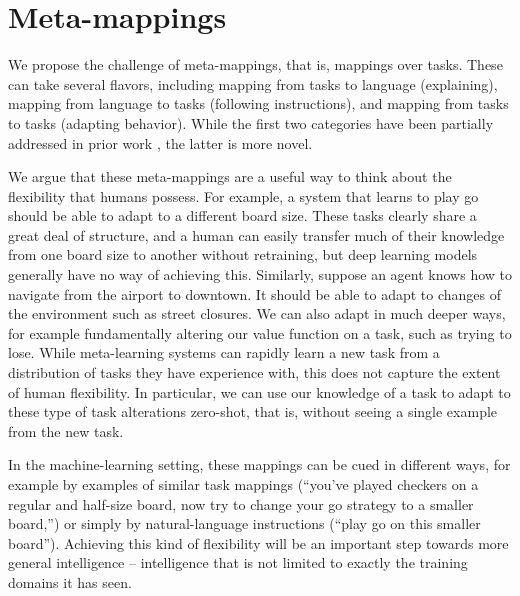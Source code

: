 \documentclass{article}
\begin{document}
\section{Meta-mappings}
We propose the challenge of meta-mappings, that is, mappings over tasks. These can take several flavors, including mapping from tasks to language (explaining), mapping from language to tasks (following instructions), and mapping from tasks to tasks (adapting behavior). While the first two categories have been partially addressed in prior work \citep[e.g.][]{Hermann2017, Co-Reyes2019}, the latter is more novel. \par
We argue that these meta-mappings are a useful way to think about the flexibility that humans possess. For example, a system that learns to play go should be able to adapt to a different board size. These tasks clearly share a great deal of structure, and a human can easily transfer much of their knowledge from one board size to another without retraining, but deep learning models generally have no way of achieving this. Similarly, suppose an agent knows how to navigate from the airport to downtown. It should be able to adapt to changes of the environment such as street closures. We can also adapt in much deeper ways, for example fundamentally altering our value function on a task, such as trying to lose. While meta-learning systems can rapidly learn a new task from a distribution of tasks they have experience with, this does not capture the extent of human flexibility. In particular, we can use our knowledge of a task to adapt to these type of task alterations zero-shot, that is, without seeing a single example from the new task. \par
In the machine-learning setting, these mappings can be cued in different ways, for example by examples of similar task mappings (``you've played checkers on a regular and half-size board, now try to change your go strategy to a smaller board,'') or simply by natural-language instructions (``play go on this smaller board''). Achieving this kind of flexibility will be an important step towards more general intelligence -- intelligence that is not limited to exactly the training domains it has seen. \par 
\end{document}
